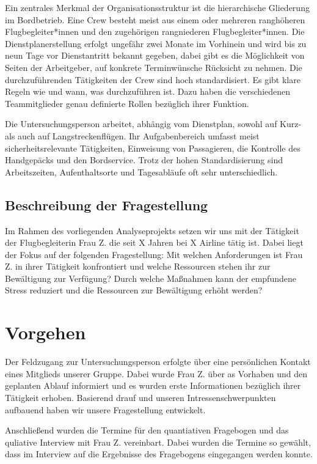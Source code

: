 \documentclass[12pt, a4paper]{article}
\begin{document}
Ein zentrales Merkmal der Organisationsstruktur ist die hierarchische Gliederung im Bordbetrieb.
Eine Crew besteht meist aus einem oder mehreren ranghöheren Flugbegleiter*innen und den zugehörigen rangniederen Flugbegleiter*innen.
Die Dienstplanerstellung erfolgt ungefähr zwei Monate im Vorhinein und wird bis zu neun Tage vor Dienstantritt bekannt gegeben, 
dabei gibt es die Möglichkeit von Seiten der Arbeitgeber, auf konkrete Terminwünsche Rücksicht zu nehmen.
Die durchzuführenden Tätigkeiten der Crew sind hoch standardisiert. Es gibt klare Regeln wie und wann, was durchzuführen ist. 
Dazu haben die verschiedenen Teammitglieder genau definierte Rollen bezüglich ihrer Funktion.

Die Untersuchungsperson arbeitet, abhängig vom Dienstplan, sowohl auf Kurz- als auch auf Langstreckenflügen. 
Ihr Aufgabenbereich umfasst meist sicherheitsrelevante Tätigkeiten,
Einweisung von Passagieren, die Kontrolle des Handgepäcks und den Bordservice.
Trotz der hohen Standardisierung sind Arbeitszeiten, Aufenthaltsorte und Tagesabläufe oft sehr unterschiedlich.


\subsection{Beschreibung der Fragestellung}

Im Rahmen des vorliegenden Analyseprojekts setzen wir uns mit der Tätigkeit der Flugbegleiterin 
Frau Z. die seit X Jahren bei X Airline tätig ist. Dabei liegt der Fokus auf der folgenden 
Fragestellung:
Mit welchen Anforderungen ist Frau Z. in ihrer Tätigkeit konfrontiert und
welche Ressourcen stehen ihr zur Bewältigung zur Verfügung? Durch welche Maßnahmen kann der empfundene 
Stress reduziert und die Ressourcen zur Bewältigung erhöht werden? 

\section{Vorgehen}

Der Feldzugang zur Untersuchungsperson erfolgte über eine persönlichen Kontakt eines Mitglieds 
unserer Gruppe. Dabei wurde Frau Z. über as Vorhaben und den geplanten Ablauf informiert und 
es wurden erste Informationen bezüglich ihrer Tätigkeit erhoben. Basierend drauf und 
unseren Intressenschwerpunkten aufbauend haben wir unsere Fragestellung entwickelt. 

Anschließend wurden die Termine für den quantiativen Fragebogen und das quliative Interview 
mit Frau Z. vereinbart. Dabei wurden die Termine so gewählt, dass im Interview auf die Ergebnisse 
des Fragebogens eingegangen werden konnte. 
\end{document}
